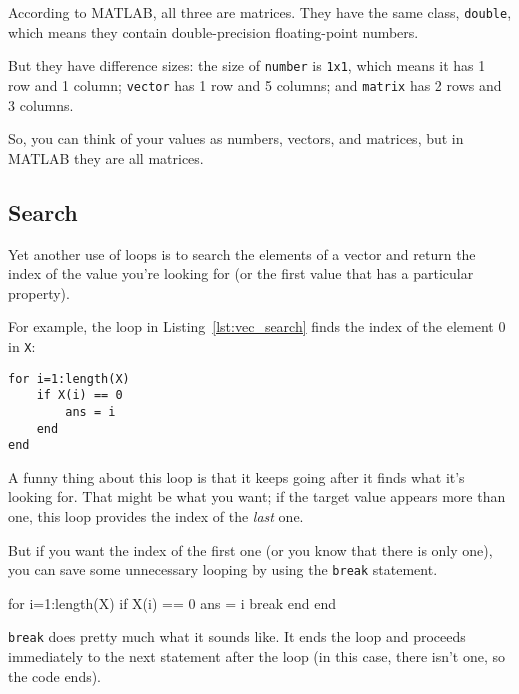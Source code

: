 According to MATLAB, all three are matrices.  They have the same class, {\tt double}, which
means they contain double-precision floating-point numbers.


But they have difference sizes: the size of {\tt number} is {\tt 1x1}, which means it has 1 row and 1 column; {\tt vector} has 1 row and 5 columns; and {\tt matrix} has 2 rows and 3 columns.

So, you can think of your values as
numbers, vectors, and matrices, but in MATLAB they are all matrices.



\subsection{Search}
\label{search}

Yet another use of loops is to search the elements of a vector
and return the index of the value you're looking for (or the
first value that has a particular property).  


For example, the loop in Listing~\ref{lst:vec_search} finds the index of the element 0 in 
{\tt X}:

\begin{lstlisting}[caption={Searching for the last appearance of 0 in a vector)}, label={lst:vec_search}]
for i=1:length(X)
    if X(i) == 0
        ans = i
    end
end
\end{lstlisting}

A funny thing about this loop is that it keeps going after it
finds what it's looking for.  That might be what you want; if the
target value appears more than one, this loop provides the index
of the {\em last} one.


But if you want the index of the first one (or you know that there
is only one), you can save some unnecessary looping by using the
{\tt break} statement.

\begin{code}
for i=1:length(X)
    if X(i) == 0
        ans = i
        break
    end
end
\end{code}

{\tt break} does pretty much what it sounds like.  It ends the
loop and proceeds immediately to the next statement after the
loop (in this case, there isn't one, so the code ends).
